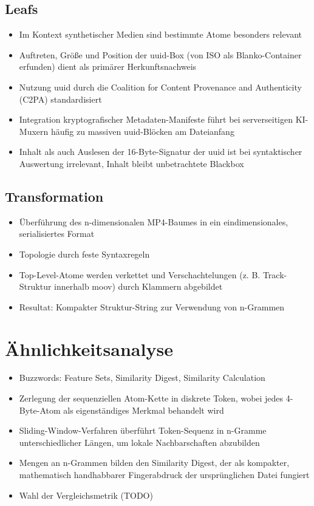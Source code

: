 

\subsection{Leafs}
\begin{itemize}
    \item Im Kontext synthetischer Medien sind bestimmte Atome besonders relevant
    \item Auftreten, Größe und Position der uuid-Box (von ISO als Blanko-Container erfunden) dient als primärer Herkunftsnachweis 
    \item Nutzung uuid durch die Coalition for Content Provenance and Authenticity (C2PA) standardisiert 
    \item Integration kryptografischer Metadaten-Manifeste führt bei serverseitigen KI-Muxern häufig zu massiven uuid-Blöcken am Dateianfang 
    \item Inhalt als auch Auslesen der 16-Byte-Signatur der uuid ist bei syntaktischer Auswertung irrelevant, Inhalt bleibt unbetrachtete Blackbox
\end{itemize}

\subsection{Transformation}

\begin{itemize}
    \item Überführung des n-dimensionalen MP4-Baumes in ein eindimensionales, serialisiertes Format 
    \item Topologie  durch feste Syntaxregeln
    \item Top-Level-Atome werden  verkettet und Verschachtelungen (z. B. Track-Struktur innerhalb moov) durch Klammern abgebildet
    \item Resultat: Kompakter Struktur-String zur Verwendung von n-Grammen
\end{itemize}

\section{Ähnlichkeitsanalyse}

\begin{itemize}
    \item Buzzwords: Feature Sets, Similarity Digest, Similarity Calculation
    \item Zerlegung der sequenziellen Atom-Kette in diskrete Token, wobei jedes 4-Byte-Atom als eigenständiges Merkmal behandelt wird 
    \item Sliding-Window-Verfahren überführt Token-Sequenz in n-Gramme unterschiedlicher Längen, um lokale Nachbarschaften abzubilden
    \item Mengen an n-Grammen bilden den Similarity Digest, der als kompakter, mathematisch handhabbarer Fingerabdruck der ursprünglichen Datei fungiert 
    \item Wahl der Vergleichsmetrik  (TODO)
\end{itemize}



